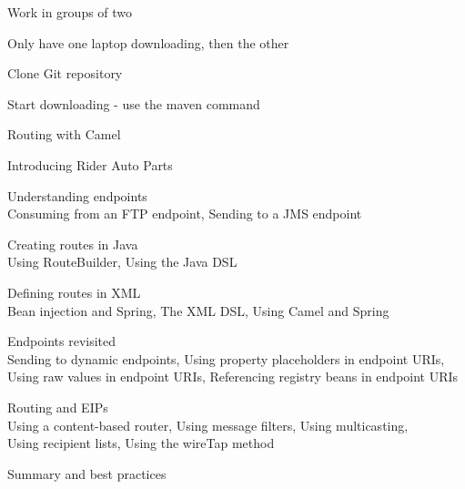 \documentclass[Screen16to9,17pt]{foils}
\begin{document}
\begin{list2}
\item Work in groups of two
\item Only have one laptop downloading, then the other
\item Clone Git repository
\item Start downloading - use the maven command
\end{list2}




\begin{list2}
\item Routing with Camel
\item  Introducing Rider Auto Parts
\item  Understanding endpoints\\
Consuming from an FTP endpoint,
Sending to a JMS endpoint
\item  Creating routes in Java\\
Using RouteBuilder,
Using the Java DSL
\item Defining routes in XML\\
Bean injection and Spring, The XML DSL,
Using Camel and Spring
\end{list2}


\begin{list2}
\item Endpoints revisited\\
Sending to dynamic endpoints, Using property placeholders
in endpoint URIs,\\
 Using raw values in endpoint
URIs, Referencing registry beans in endpoint URIs
\item Routing and EIPs\\
Using a content-based router, Using message
filters, Using multicasting,\\
Using recipient
lists, Using the wireTap method
\item Summary and best practices
\end{list2}


\slide{}

\begin{list2}
\item
\item
\end{list2}


\end{document}
